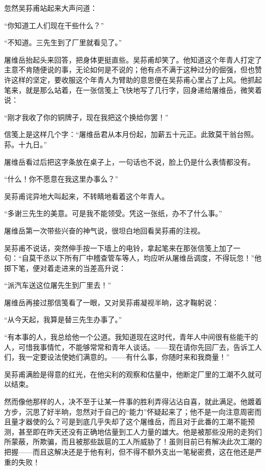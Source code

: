 \par 忽然吴荪甫站起来大声问道：
\par “你知道工人们现在干些什么？”
\par “不知道。三先生到了厂里就看见了。”
\par 屠维岳抬起头来回答，把身体更挺直些。吴荪甫却笑了。他知道这个年青人打定了主意不肯随便说的事，无论如何是不说的；他有点不满于这种过分的倔强，但也赞许这样的坚定，要收服这个年青人为臂助的意思便在吴荪甫心里占了上风。他抓起笔来，就是那么站着，在一张信笺上飞快地写了几行字，回身递给屠维岳，微笑着说：
\par “刚才我收了你的铜牌子，现在我把这个换给你罢！”
\par 信笺上是这样几个字：“屠维岳君从本月份起，加薪五十元正。此致莫干翁台照。荪。十九日。”
\par 屠维岳看过后把这字条放在桌子上，一句话也不说，脸上仍是什么表情都没有。
\par “什么！你不愿意在我这里办事么？”
\par 吴荪甫诧异地大叫起来，不转睛地看着这个年青人。
\par “多谢三先生的美意。可是我不能领受。凭这一张纸，办不了什么事。”
\par 屠维岳第一次带些兴奋的神气说，很坦白地回看吴荪甫的注视。
\par 吴荪甫不说话，突然伸手按一下墙上的电铃，拿起笔来在那张信笺上加了一句：“自莫干丞以下所有厂中稽查管车等人，均应听从屠维岳调度，不得玩忽！”他掷下笔，便对着走进来的当差高升说：
\par “派汽车送这位屠先生到厂里去！”
\par 屠维岳再接过那信笺看了一眼，又对吴荪甫凝视半晌，这才鞠躬说：
\par “从今天起，我算是替三先生办事了。”
\par “有本事的人，我总给他一个公道。我知道现在这时代，青年人中间很有些能干的人，可惜我事情忙，不能够常常和青年人谈话。——现在请你先回厂去，告诉工人们，我一定要设法使她们满意的。——有什么事，你随时来和我商量！”
\par 吴荪甫满脸是得意的红光，在他尖利的观察和估量中，他断定厂里的工潮不久就可以结束。
\par 然而像他那样的人，决不至于让某一件事的胜利弄得沾沾自喜，就此满足。他踱着方步，沉思了好半晌，忽然对于自己的“能力”怀疑起来了；他不是一向注意周密而且量才器使的么？可是到底几乎失却了这个屠维岳，而且对于此番的工潮不能预测，甚至即在昨天还没有正确地估量到工人力量的雄大。他是被那些没用的走狗们所蒙蔽，所欺骗，而且被那些跋扈的工人所威胁了！虽则目前已有解决此次工潮的把握——而且这解决还是于他有利，但不得不额外支出一笔秘密费，这在他还是严重的失败！
